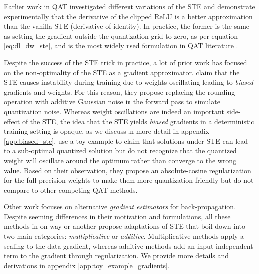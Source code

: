 \label{sec:related_work}
Earlier work in QAT \citep{guassian_quant, understanding_STE} investigated different variations of the STE and demonstrate experimentally 
that the derivative of the clipped ReLU is a better approximation than the vanilla STE (derivative of identity). In practice, the former is the same as setting the gradient outside the quantization grid to zero, as per equation \eqref{eq:dl_dw_ste}, and is the most widely used formulation in QAT literature \citep{pact2018, lsq, differentiablequantization}.

Despite the success of the STE trick in practice, a lot of prior work has focused on the non-optimality of the STE as a gradient approximator. \citet{diffq} claim that the STE causes instability during training due to weights oscillating leading to \textit{biased} gradients and weights. For this reason, they propose replacing the rounding operation with additive Gaussian noise in the forward pass to simulate quantization noise. Whereas weight oscillations are indeed an important side-effect of the STE, the idea that the STE yields \textit{biased} gradients in a deterministic training setting is opaque, as we discuss in more detail in appendix \ref{app:biased_ste}. \citet{qat_abs_cosine} use a toy example to claim that solutions under STE can lead to a sub-optimal quantized solution but do not recognize that the quantized weight will oscillate around the optimum rather than converge to the wrong value. Based on their observation, they propose an absolute-cosine regularization for the full-precision weights to make them more quantization-friendly but do not compare to other competing QAT methods.

Other work focuses on alternative \textit{gradient estimators} for back-propagation. Despite seeming differences in their motivation and formulations, all these methods in on way or another propose adaptations of STE that boil down into two main categories: \textit{multiplicative} or \textit{additive}. Multiplicative methods apply a scaling to the data-gradient, whereas additive methods add an input-independent term to the gradient through regularization. We provide more details and derivations in appendix \ref{app:toy_example_gradients}. 



